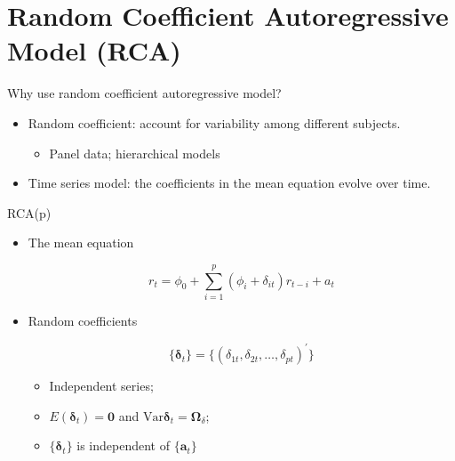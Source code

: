 \documentclass[presentation,10pt]{beamer}
\newcommand{\var}{\mathrm{Var}}
\begin{document}
\section{Random Coefficient Autoregressive Model (RCA)}
\label{sec:org98ba0cb}

\begin{frame}[label={sec:org2da6093}]{Why use random coefficient autoregressive model?}
\begin{itemize}
\item Random coefficient: account for variability among different subjects.
\begin{itemize}
\item Panel data; hierarchical models
\end{itemize}
\end{itemize}

\vspace{0.2cm}

\begin{itemize}
\item Time series model: the coefficients in the mean equation evolve over time.
\end{itemize}
\end{frame}

\begin{frame}[label={sec:org445e853}]{RCA(p)}
\begin{itemize}
\item The mean equation

\begin{equation*}
r_t = \phi_0 + \sum_{i=1}^p (\phi_i + \delta_{it}) r_{t-i} + a_t
\end{equation*}

\item Random coefficients

\[\{\boldsymbol{\delta}_t\} = \{(\delta_{1t}, \delta_{2t}, \ldots,
  \delta_{pt})^{\prime}\}\]

\begin{itemize}
\item Independent series;
\item \(E(\boldsymbol{\delta}_t) = \mathbf{0}\) and
\(\var{\boldsymbol{\delta}_t} = \boldsymbol{\Omega}_{\delta}\);
\item \(\{\boldsymbol{\delta}_t\}\) is independent of \(\{\mathbf{a}_t\}\)
\end{itemize}
\end{itemize}
\end{frame}
\end{document}
